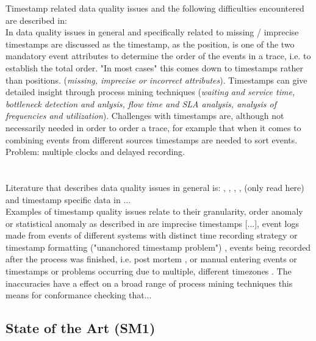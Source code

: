 \documentclass[
	a4paper,
	pagesize,
	pdftex,
	12pt,
	ngerman,
	fleqn,
	final,
	]{scrartcl}
\theoremstyle{plain}
\theoremstyle{definition}
\begin{document}
	Timestamp related data quality issues and the following difficulties encountered are described in: \\
	In \cite{AalstWilvander2016Pm:d} data quality issues in general and specifically related to missing / imprecise timestamps are discussed as the timestamp, as the position, is one of the two mandatory event attributes to determine the order of the events in a trace, i.e. to establish the total order. "In most cases" this comes down to timestamps rather than positions. (\textit{missing, imprecise or incorrect attributes}). Timestamps can give detailed insight through process mining techniques (\textit{waiting and service time, bottleneck detection and anlysis, flow time and SLA analysis, analysis of frequencies and utilization}). Challenges with timestamps are, although not necessarily needed in order to order a trace, for example that when it comes to combining events from different sources timestamps are needed to sort events. Problem: multiple clocks and delayed recording. \\
	\cite{suriadi2017event}\\
	\cite{mans2012process}\\
	Literature that describes data quality issues in general is: \cite{AalstWilvander2016Pm:d}, \cite{van2011process}, \cite{bose2013wanna}, \cite{suriadi2017event}, \cite{mans2015data} (only read here) and timestamp specific data in \cite{gschwandtner2012taxonomy}...\\
	Examples of timestamp quality issues relate to their granularity, order anomaly or statistical anomaly as described in \cite{dixit2018detection} are imprecise timestamps \cite{AalstWilvander2016Pm:d}\cite{mans2015data}[...], event logs made from events of different systems with distinct time recording strategy \cite{van2011process}\cite{gschwandtner2012taxonomy} or timestamp formatting ("unanchored timestamp problem") \cite{gschwandtner2012taxonomy}\cite{suriadi2017event}, events being recorded after the process was finished, i.e. post mortem \cite{AalstWilvander2016Pm:d}, or manual entering events or timestamps \cite{mans2015data}\cite{lu2014conformance} or problems occurring due to multiple, different timezones \cite{gschwandtner2012taxonomy}.
	The inaccuracies have a effect on a broad range of process mining techniques \cite{dixit2018detection} this means for conformance checking that...\\
	
	
	\subsection{State of the Art (SM1)}\label{sec:introduction::state-of-art}
	
\end{document}
